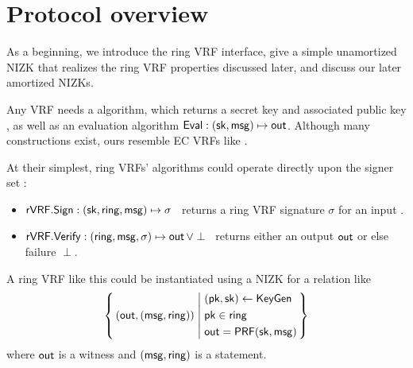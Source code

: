 \section{Protocol overview}
\label{sec:overview}

As a beginning, we introduce the ring VRF interface, give a simple
unamortized NIZK that realizes the ring VRF properties discussed later,
and discuss our later amortized NIZKs.

Any VRF needs a \KeyGen algorithm, which returns a secret key \sk and
associated public key \pk, as well as an evaluation algorithm
${\mathsf{Eval}} : (\mathsf{sk},\mathsf{msg}) \mapsto {\ensuremath{\mathsf{out}}}$. %
%
Although many constructions exist,
 ours resemble EC VRFs like \cite{nsec5,VXEd25519,draft-irtf-cfrg-vrf-10}.

At their simplest, ring VRFs' algorithms could operate directly
upon the signer set \ring:
\begin{itemize}
\item ${\mathsf{rVRF}}.{\mathsf{Sign}} : (\mathsf{sk},\mathsf{ring},\mathsf{msg}) \mapsto \sigma$ \,
    returns a ring VRF signature $\sigma$ for an input \msg.
\item ${\mathsf{rVRF}}.{\mathsf{Verify}} : (\mathsf{ring},\mathsf{msg},\sigma) \mapsto {\ensuremath{\mathsf{out}}} \, \lor \perp$ \,
    returns either an output ${\mathsf{out}}$ or else failure $\perp$.
\end{itemize}

A ring VRF like this could be instantiated using a NIZK for a relation like
$$ \Setst{ (\Out, (\msg, \ring)) }{
    \eprint{
        (\pk,\sk) \leftarrow \KeyGen, \quad %
        \pk \in \ring, \quad
        \Out = \PRF(\sk,\msg)
    }{
        \begin{aligned}
        & (\pk,\sk) \leftarrow \KeyGen \\
        & \pk \in \ring \\
        & \Out = \PRF(\sk,\msg)
        \end{aligned}
    }
} $$
where $ {\mathsf{out}} $ is a witness and $ (\mathsf{msg},\mathsf{ring}) $ is a statement.

